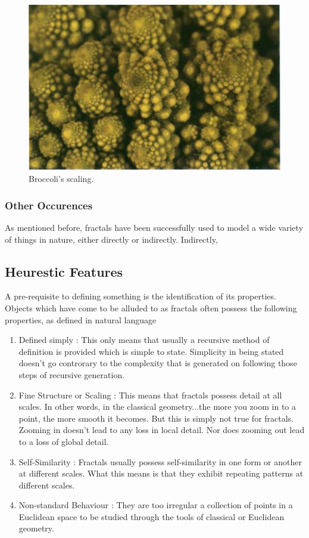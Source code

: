 \begin{figure}[h!]
  \includegraphics[width=\linewidth]{Pictures/broccoli_zoomed.png}
  \caption{Broccoli's scaling.}
  \label{fig:broccoli_zoomed}
\end{figure}
\subsubsection{Other Occurences}
As mentioned before, fractals have been successfully used to model a wide
variety of things in nature, either directly or indirectly. Indirectly, 
\subsection{Heurestic Features}
A pre-requisite to defining something is the identification of its properties.
Objects which have come to be alluded to as fractals often possess the following
properties, as defined in natural language
\begin{enumerate}
    \item Defined simply : This only means that usually a recursive method of
        definition is provided which is simple to state. Simplicity in being
        stated doesn't go controrary to the complexity that is generated on
        following those steps of recursive generation.
    \item Fine Structure or Scaling : This means that fractals possess detail at
        all
        scales. In other words, in the classical geometry...the more you zoom in
        to a point, the more smooth it becomes. But this is simply not true for
        fractals. Zooming in doesn't lead to any loss in local detail. Nor does
        zooming out lead to a loss of global detail.
    \item Self-Similarity : Fractals usually possess self-similarity in one form
        or another at different scales. What this means is that they exhibit
        repeating patterns at different scales.
    \item Non-standard Behaviour : 
        They are too irregular a collection of points in a Euclidean space to
        be studied through the tools of classical or Euclidean geometry.
\end{enumerate}


